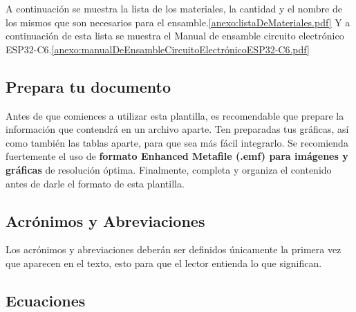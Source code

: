      A continuación se muestra la lista de los materiales, la cantidad y el nombre de los mismos que son necesarios para el ensamble.\ref{anexo:listaDeMateriales.pdf}
     Y a continuación de esta lista se muestra el Manual de ensamble circuito electrónico ESP32-C6.\ref{anexo:manualDeEnsambleCircuitoElectrónicoESP32-C6.pdf}
    
    \subsection{Prepara tu documento}
    
    Antes de que comiences a utilizar esta plantilla, es recomendable que prepare la información que contendrá en un archivo aparte. 
    Ten preparadas tus gráficas, así como también las tablas aparte, para que sea más fácil integrarlo. 
    Se recomienda fuertemente el uso de \textbf{formato Enhanced Metafile (.emf) para imágenes y gráficas} de resolución óptima. 
    Finalmente, completa y organiza el contenido antes de darle el formato de esta plantilla. 
    
    \subsection{Acrónimos y Abreviaciones}
    
    Los acrónimos y abreviaciones deberán ser definidos únicamente la primera vez que aparecen en el texto, esto para que el lector entienda lo que significan.
    
    \subsection{Ecuaciones}
    
